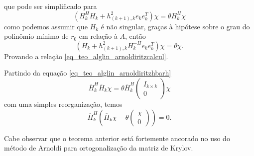 que pode ser simplificado para
\[(H_k^H H_k+h_{(k+1),k}^2 e_k e_k^T)\chi=\theta H_k^H\chi
\]
como podemos assumir que $H_k$ é não singular, graças à hip\'{o}tese sobre o grau do polinômio mínimo de $r_0$  em relação à $A$, então
\[(H_k+h_{(k+1),k}^2 H_k^{-H} e_k e_k^T)\chi =  \theta\chi.
\]
Provando a relação \eqref{eq_teo_alglin_arnoldiritzcalcul}.

Partindo da equação \eqref{eq_teo_alglin_arnoldiritzhbarh}
\[
  \overline{H}_k^H\overline{H}_k\chi =\theta\overline{H}_k^H \begin{pmatrix}I_{k\times k}\\ 0\end{pmatrix}\chi
\]
com uma simples reorganização, temos
\[
 \overline{H}_k^H (\overline{H}_k \chi-  \theta\begin{pmatrix} \chi\\0 \end{pmatrix})=0.
\]
\fim

 Cabe observar que o teorema anterior está fortemente ancorado no uso do método de Arnoldi para ortogonalização da matriz de Krylov.



